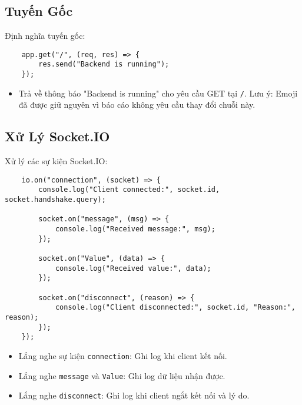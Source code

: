         \subsection{Tuyến Gốc}
            \hspace*{0.6cm}Định nghĩa tuyến gốc:
            \begin{lstlisting}
    app.get("/", (req, res) => {
        res.send("Backend is running");
    });
            \end{lstlisting}
            \begin{itemize}
                \item Trả về thông báo "Backend is running" cho yêu cầu GET tại \texttt{/}. Lưu ý: Emoji đã được giữ nguyên vì báo cáo không yêu cầu thay đổi chuỗi này.
            \end{itemize}

        \subsection{Xử Lý Socket.IO}
            \hspace*{0.6cm}Xử lý các sự kiện Socket.IO:
            \begin{lstlisting}
    io.on("connection", (socket) => {
        console.log("Client connected:", socket.id, socket.handshake.query);

        socket.on("message", (msg) => {
            console.log("Received message:", msg);
        });

        socket.on("Value", (data) => {
            console.log("Received value:", data);
        });

        socket.on("disconnect", (reason) => {
            console.log("Client disconnected:", socket.id, "Reason:", reason);
        });
    });
            \end{lstlisting}
            \begin{itemize}
                \item Lắng nghe sự kiện \texttt{connection}: Ghi log khi client kết nối.
                \item Lắng nghe \texttt{message} và \texttt{Value}: Ghi log dữ liệu nhận được.
                \item Lắng nghe \texttt{disconnect}: Ghi log khi client ngắt kết nối và lý do.
            \end{itemize}

